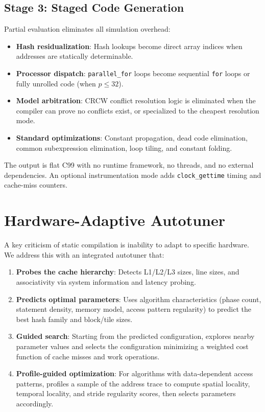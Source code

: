 \documentclass[11pt]{article}
\begin{document}
\subsection{Stage 3: Staged Code Generation}

Partial evaluation eliminates all simulation overhead:

\begin{itemize}
\item \textbf{Hash residualization}: Hash lookups become direct array
  indices when addresses are statically determinable.
\item \textbf{Processor dispatch}: \texttt{parallel\_for} loops become
  sequential \texttt{for} loops or fully unrolled code (when $p \le 32$).
\item \textbf{Model arbitration}: CRCW conflict resolution logic is
  eliminated when the compiler can prove no conflicts exist, or
  specialized to the cheapest resolution mode.
\item \textbf{Standard optimizations}: Constant propagation, dead code
  elimination, common subexpression elimination, loop tiling, and
  constant folding.
\end{itemize}

The output is flat C99 with no runtime framework, no threads, and no
external dependencies.  An optional instrumentation mode adds
\texttt{clock\_gettime} timing and cache-miss counters.


\section{Hardware-Adaptive Autotuner}
\label{sec:autotuner}

A key criticism of static compilation is inability to adapt to specific
hardware.  We address this with an integrated autotuner that:

\begin{enumerate}
\item \textbf{Probes the cache hierarchy}: Detects L1/L2/L3 sizes, line
  sizes, and associativity via system information and latency probing.
\item \textbf{Predicts optimal parameters}: Uses algorithm characteristics
  (phase count, statement density, memory model, access pattern regularity)
  to predict the best hash family and block/tile sizes.
\item \textbf{Guided search}: Starting from the predicted configuration,
  explores nearby parameter values and selects the configuration minimizing
  a weighted cost function of cache misses and work operations.
\item \textbf{Profile-guided optimization}: For algorithms with
  data-dependent access patterns, profiles a sample of the address trace
  to compute spatial locality, temporal locality, and stride regularity
  scores, then selects parameters accordingly.
\end{enumerate}
\end{document}
